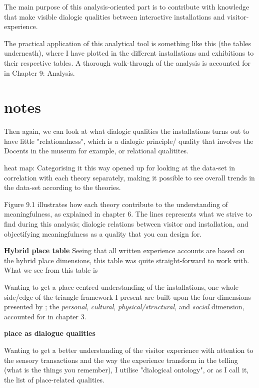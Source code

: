 The main purpose of this analysis-oriented part is to contribute with knowledge that make visible dialogic qualities between interactive installations and visitor-experience.

The practical application of this analytical tool is something like this (the tables underneath), where I have plotted in the different installations and exhibitions to their respective tables. A thorough walk-through of the analysis is accounted for in Chapter 9: Analysis.


\section{notes}

\par Then again, we can look at what dialogic qualities the installations turns out to have little "relationalness", which is a dialogic principle/ quality that involves the Docents in the museum for example, or relational qualitites.


heat map: Categorising it this way opened up for looking at the data-set in correlation with each theory separately, making it possible to see overall trends in the data-set according to the theories. 

Figure 9.1 illustrates how each theory contribute to the understanding of meaningfulness, as explained in chapter 6. The lines represents what we strive to find during this analysis; dialogic relations between visitor and installation, and objectifying meaningfulness as a quality that you can design for.



\textbf{Hybrid place table}
Seeing that all written experience accounts are based on the hybrid place dimensions, this table was quite straight-forward to work with. What we see from this table is 

Wanting to get a place-centred understanding of the installations, one whole side/edge of the triangle-framework I present are built upon the four dimensions presented by \autocite{hybridplace_ciolfi}; the \emph{personal}, \emph{cultural}, \emph{physical/structural}, and \emph{social} dimension, accounted for in chapter 3.


\textbf{place as dialogue qualities}

Wanting to get a better understanding of the visitor experience with attention to the sensory transactions and the way the experience transform in the telling (what is the things you remember), I utilise \autocite{spaceplace_ciolfi} "dialogical ontology", or as I call it, the list of place-related qualities. 

